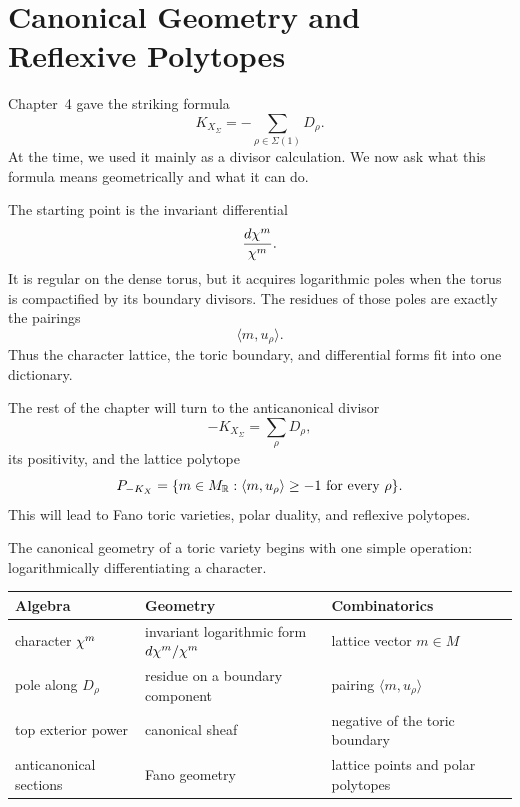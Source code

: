 \chapter[Canonical Geometry and Reflexive Polytopes]
{Canonical Geometry and\\ Reflexive Polytopes}
\label{chap:canonical-geometry-reflexive-polytopes}

\begin{chapteroverview}
Chapter~4 gave the striking formula
\[
K_{X_\Sigma}=-\sum_{\rho\in\Sigma(1)}D_\rho.
\]
At the time, we used it mainly as a divisor calculation. We now ask
what this formula means geometrically and what it can do.

The starting point is the invariant differential
\[
\frac{d\chi^{m}}{\chi^{m}}.
\]
It is regular on the dense torus, but it acquires logarithmic poles
when the torus is compactified by its boundary divisors. The residues
of those poles are exactly the pairings
\[
\langle m,u_\rho\rangle.
\]
Thus the character lattice, the toric boundary, and differential forms
fit into one dictionary.

The rest of the chapter will turn to the anticanonical divisor
\[
-K_{X_\Sigma}=\sum_\rho D_\rho,
\]
its positivity, and the lattice polytope
\[
P_{-K_X}
=
\{m\in M_{\mathbb{R}}:\langle m,u_\rho\rangle\geq-1\text{ for every }\rho\}.
\]
This will lead to Fano toric varieties, polar duality, and reflexive
polytopes.
\end{chapteroverview}

\begin{threedictionaries}
The canonical geometry of a toric variety begins with one simple
operation: logarithmically differentiating a character.

\medskip

\begin{center}
\small
\begin{tabularx}{\linewidth}{@{}
  >{\raggedright\arraybackslash}X
  >{\raggedright\arraybackslash}X
  >{\raggedright\arraybackslash}X@{}}
\toprule
\textbf{Algebra}
&
\textbf{Geometry}
&
\textbf{Combinatorics}
\\
\midrule
character \(\chi^{m}\)
&
invariant logarithmic form
\(d\chi^{m}/\chi^{m}\)
&
lattice vector \(m\in M\)
\\
pole along \(D_\rho\)
&
residue on a boundary component
&
pairing \(\langle m,u_\rho\rangle\)
\\
top exterior power
&
canonical sheaf
&
negative of the toric boundary
\\
anticanonical sections
&
Fano geometry
&
lattice points and polar polytopes
\\
\bottomrule
\end{tabularx}
\end{center}
\end{threedictionaries}

